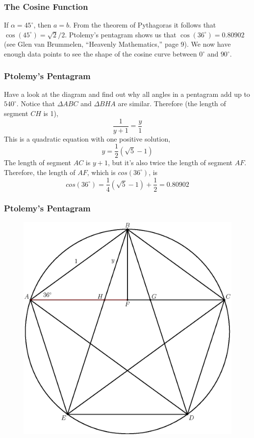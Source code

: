 \documentclass[xcolor=dvipsnames]{beamer}
\begin{document}
\begin{frame}
  \frametitle{The Cosine Function}
  If $\alpha=45^{\circ}$, then $a=b$. From the theorem of Pythagoras
  it follows that $\cos(45^{\circ})=\sqrt{2}/2$. Ptolemy's pentagram
  shows us that $\cos(36^{\circ})=0.80902$ (see Glen van Brummelen,
  ``Heavenly Mathematics,'' page 9). We now have enough data points to
  see the shape of the cosine curve between $0^{\circ}$ and
  $90^{\circ}$.
\end{frame}

\begin{frame}
  \frametitle{Ptolemy's Pentagram}
  Have a look at the diagram and find out why all angles in a
  pentagram add up to $540^{\circ}$. Notice that $\Delta{}ABC$ and
  $\Delta{}BHA$ are similar. Therefore (the length of segment $CH$ is
  1),
\begin{equation}
  \label{eq:ataicahd}
  \frac{1}{y+1}=\frac{y}{1}
\end{equation}
This is a quadratic equation with one positive solution,
\begin{equation}
  \label{eq:ziumahhi}
  y=\frac{1}{2}\left(\sqrt{5}-1\right)
\end{equation}
The length of segment $AC$ is $y+1$, but it's also twice the length of
segment $AF$. Therefore, the length of $AF$, which is
$cos(36^{\circ})$, is
\begin{equation}
  \label{eq:puuvahhi}
 cos(36^{\circ})=\frac{1}{4}\left(\sqrt{5}-1\right)+\frac{1}{2}=0.80902
\end{equation}
\end{frame}

\begin{frame}
  \frametitle{Ptolemy's Pentagram}
    \begin{figure}[h]
    \includegraphics[scale=.6]{./ptolemy1.eps}
  \end{figure}
\end{frame}
\end{document}
